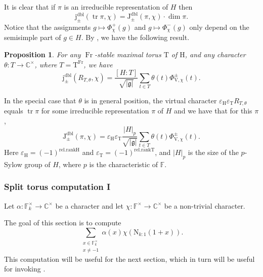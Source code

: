 \documentclass[12pt, reqno]{amsart}
\newtheorem{proposition}[theorem]{Proposition}
\theoremstyle{definition}
\theoremstyle{definition}
\theoremstyle{definition}
\newcommand{\cComplex}{\mathbb{C}}
\newcommand{\multiplicativegroup}[1]{#1^{\times}}
\newcommand{\sizeof}[1]{\left|#1\right|}
\newcommand{\hermitianSpace}{\mathrm{V}}
\newcommand{\grpIndex}[2]{\left[#1:#2\right]}
\newcommand{\trace}{\operatorname{tr}}
\newcommand{\FieldNorm}[2]{\mathrm{N}_{#1:#2}}
\newcommand{\finiteField}{\mathbb{F}}
\newcommand{\finiteFieldExtension}[1]{\finiteField_{#1}}
\newcommand{\Frobenius}{\operatorname{Fr}}
\newcommand{\posJacobiKernel}[1]{\Phi^{+}_{#1}}
\newcommand{\negJacobiKernel}[1]{\Phi^{-}_{#1}}
\newcommand{\genHermitianJacobiKernel}[2]{\Phi^{\pm}_{#1,#2}}
\newcommand{\dblJacobiSumScalar}[2]{\mathrm{J}_{\pm}^{\mathrm{dbl}}\left(#1, #2\right)}
\newcommand{\dblVirtualJacobiSumScalar}[2]{\mathrm{j}_{\pm}^{\mathrm{dbl}}\left(#1, #2\right)}
\newcommand{\lieAlgebra}{\mathfrak{g}}
\newcommand{\algebraicGroup}[1]{\boldsymbol{\mathrm{#1}}}
\begin{document}
It is clear that if $\pi$ is an irreducible representation of $H$ then $$\dblVirtualJacobiSumScalar{\trace \pi}{\chi} = \dblJacobiSumScalar{\pi}{\chi} \cdot \dim \pi.$$
Notice that the assignments $g \mapsto \posJacobiKernel{\chi}\left(g\right)$ and $g \mapsto \negJacobiKernel{\chi}\left(g\right)$ only depend on the semisimple part of $g \in H$. By \cite[Theorem in Section 1.2]{SaitoShinoda2000}, we have the following result.
\begin{proposition}\label{prop:reduction-of-gauss-sum-to-torus}
	For any $\Frobenius$-stable maximal torus $\algebraicGroup{T}$ of $\algebraicGroup{H}$, and any character $\theta \colon T \to \multiplicativegroup{\cComplex}$, where $T = \algebraicGroup{T}^{\Frobenius}$, we have
	$$ \dblVirtualJacobiSumScalar{R_{T, \theta}}{\chi} = \frac{\grpIndex{H}{T}}{\sqrt{\sizeof{\lieAlgebra}}} \sum_{t \in T} \theta\left(t\right) \genHermitianJacobiKernel{\hermitianSpace}{\chi}\left(t\right).$$
\end{proposition}
In the special case that $\theta$ is in general position, the virtual character $\varepsilon_{\algebraicGroup{H}} \varepsilon_{\algebraicGroup{T}} R_{T, \theta}$ equals $\trace \pi$ for some irreducible representation $\pi$ of $H$ and we have that for this $\pi$,
$$\dblJacobiSumScalar{\pi}{\chi} = \varepsilon_{\algebraicGroup{H}} \varepsilon_{\algebraicGroup{T}} \frac{\sizeof{H}_p}{\sqrt{\sizeof{\lieAlgebra}}} \sum_{t \in T} \theta\left(t\right) \genHermitianJacobiKernel{\hermitianSpace}{\chi}\left(t\right).$$
Here $\varepsilon_{\algebraicGroup{H}} = \left(-1\right)^{\mathrm{rel.rank} \algebraicGroup{H}}$ and $\varepsilon_{\algebraicGroup{T}} = \left(-1\right)^{\mathrm{rel.rank} \algebraicGroup{T}}$, and $\sizeof{H}_p$ is the size of the $p$-Sylow group of $H$, where $p$ is the characteristic of $\finiteField$. 

\subsubsection{Split torus computation I}
Let $\alpha \colon \multiplicativegroup{\finiteFieldExtension{k}} \to \multiplicativegroup{\cComplex}$ be a character and let $\chi \colon \multiplicativegroup{\finiteField} \to \multiplicativegroup{\cComplex}$ be a non-trivial character.

The goal of this section is to compute $$\sum_{\substack{x \in \multiplicativegroup{\finiteFieldExtension{k}}\\
x \ne -1}} \alpha\left(x\right) \chi\left(\FieldNorm{k}{1}\left(1+x\right)\right).$$
This computation will be useful for the next section, which in turn will be useful for invoking .
\end{document}
